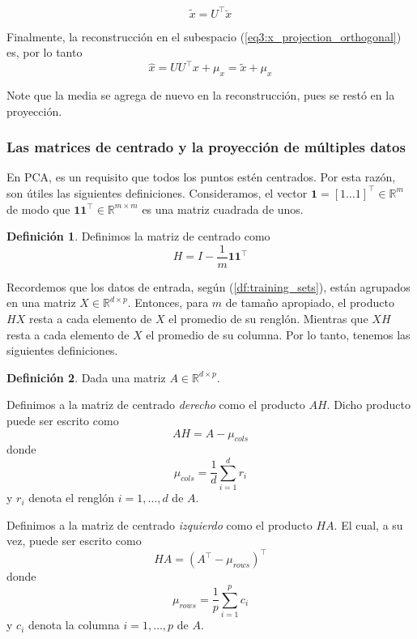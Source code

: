 \documentclass{article}
\numberwithin{equation}{section}
\theoremstyle{remark}
\theoremstyle{definition}
\newtheorem{definition}{Definición}
\theoremstyle{remark}
\theoremstyle{remark}
\begin{document}
\begin{equation}
    \label{eq:x_tilde}
    \tilde{x} = U^\intercal \breve{x} 
\end{equation}

Finalmente, la reconstrucción en el subespacio (\ref{eq3:x_projection_orthogonal}) es, por lo tanto
\begin{equation}
    \label{eq:x_hat}
    \hat{x} = U U^\intercal x + \mu_x = \tilde{x} + \mu_x
\end{equation}

Note que la media se agrega de nuevo en la reconstrucción, pues se restó en la proyección.

\subsubsection{Las matrices de centrado y la proyección de múltiples datos}
En PCA, es un requisito que todos los puntos estén centrados. Por esta razón, son útiles las siguientes definiciones.
Consideramos, el vector $\boldsymbol{1} = [1 \ldots 1]^\intercal \in \mathbb{R}^m$ de modo que $\boldsymbol{1} \boldsymbol{1}^\intercal \in \mathbb{R}^{m \times m}$
es una matriz cuadrada de unos.

\begin{definition}
    \label{df:centering_matrix}
    Definimos la matriz de centrado como
    $$H = I - \frac{1}{m} \boldsymbol{1} \boldsymbol{1}^\intercal$$
\end{definition}

Recordemos que los datos de entrada, según (\ref{df:training_sets}), están agrupados en una matriz $X \in \mathbb{R}^{d \times p}$. 
Entonces, para $m$ de tamaño apropiado, el producto $H X$ resta a cada elemento de $X$ el promedio de su renglón.
Mientras que $X H$ resta a cada elemento de $X$ el promedio de su columna. 
Por lo tanto, tenemos las siguientes definiciones.

\begin{definition}
    Dada una matriz $A \in \mathbb{R}^{d \times p}$. 

    Definimos a la matriz de centrado \textit{derecho} como el producto $AH$. 
    Dicho producto puede ser escrito como
    $$AH = A - \mu_{cols}$$
    donde
    $$\mu_{cols} = \frac{1}{d} \sum^d_{i = 1} r_i$$
    y $r_i$ denota el renglón $i = 1, \ldots, d$ de $A$.

    Definimos a la matriz de centrado \textit{izquierdo} como el producto $HA$. 
    El cual, a su vez, puede ser escrito como
    $$HA = (A^\intercal - \mu_{rows})^\intercal$$
    donde
    $$\mu_{rows} = \frac{1}{p} \sum^p_{i = 1} c_i$$
    y $c_i$ denota la columna $i = 1, \ldots, p$ de $A$.
\end{definition}
\end{document}

